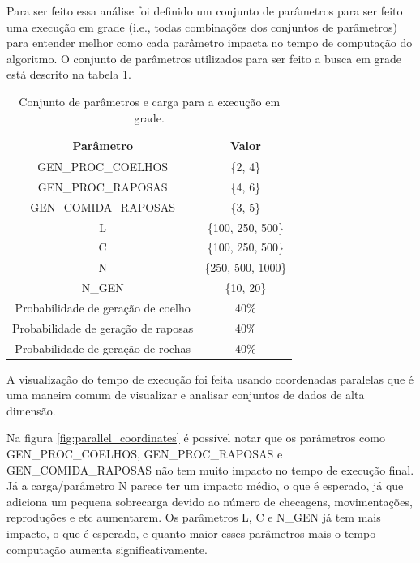\documentclass[12pt]{article}
\begin{document}
Para ser feito essa análise foi definido um conjunto de parâmetros para ser feito uma execução em grade (i.e., todas combinações dos conjuntos de parâmetros) para entender melhor como cada parâmetro impacta no tempo de computação do algoritmo. O conjunto de parâmetros utilizados para ser feito a busca em grade está descrito na tabela \ref{tab:gradeparam}.

\begin{table}[H]
	\begin{center}
		\begin{tabular}{|c|c|}
			\hline
			Parâmetro                           & Valor              \\
			\hline
			GEN\_PROC\_COELHOS                  & \{2, 4\}           \\
			GEN\_PROC\_RAPOSAS                  & \{4, 6\}           \\
			GEN\_COMIDA\_RAPOSAS                & \{3, 5\}            \\
			L                                   & \{100, 250, 500\}  \\
			C                                   & \{100, 250, 500\}  \\
			N                                   & \{250, 500, 1000\} \\
			N\_GEN                              & \{10, 20\}         \\\hline
			Probabilidade de geração de coelho  & 40\%               \\
			Probabilidade de geração de raposas & 40\%               \\
			Probabilidade de geração de rochas  & 40\%               \\
			\hline
		\end{tabular}
	\end{center}
	\caption{Conjunto de parâmetros e carga para a execução em grade.}
	\label{tab:gradeparam}
\end{table}

A visualização do tempo de execução foi feita usando coordenadas paralelas que é uma maneira comum de visualizar e analisar conjuntos de dados de alta dimensão.





Na figura \ref{fig:parallel_coordinates} é possível notar que os parâmetros como 
GEN\_PROC\_COELHOS,
GEN\_PROC\_RAPOSAS e  
GEN\_COMIDA\_RAPOSAS não tem muito impacto no tempo de execução final. Já a carga/parâmetro N parece ter um impacto médio, o que é esperado, já que adiciona um pequena sobrecarga devido ao número de checagens, movimentações, reproduções e etc aumentarem. Os parâmetros L, C e N\_GEN já tem mais impacto, o que é esperado, e quanto maior esses parâmetros mais o tempo computação aumenta significativamente.
\end{document}
